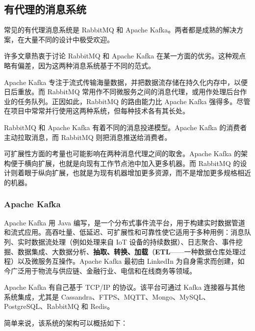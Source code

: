 \subsection{有代理的消息系统}

\label{idx:1534}
常见的有代理消息系统是 RabbitMQ 和 Apache Kafka。两者都是成熟的解决方案，在大量不同的设计中极受欢迎。

\label{idx:1535}
许多文章热衷于讨论 RabbitMQ 和 Apache Kafka 在某一方面的优劣。这种观点略有偏差，因为这两种消息系统基于不同的范式。

Apache Kafka 专注于流式传输海量数据，并把数据流存储在持久化内存中，以便日后重放。而 RabbitMQ 常用作不同微服务之间的消息代理，或用作处理后台作业的任务队列。正因如此，RabbitMQ 的路由能力比 Apache Kafka 强得多。尽管在项目中常常并行使用这两种系统，但每种技术各有其长处。

RabbitMQ 和 Apache Kafka 有着不同的消息投递模型。Apache Kafka 的消费者主动拉取消息，而 RabbitMQ 则把消息推送给消费者。

可扩展性方面的考量也可能影响在两种消息代理之间的取舍。Apache Kafka 的架构便于横向扩展，也就是向现有工作节点池中加入更多机器。而 RabbitMQ 的设计则着眼于纵向扩展，也就是为现有机器增加更多资源，而不是增加更多规格相近的机器。

\subsubsection{Apache Kafka}

\label{idx:1536}
\label{idx:1537}
\label{idx:1538}
Apache Kafka 用 Java 编写，是一个分布式事件流平台，用于构建实时数据管道和流式应用。高吞吐量、低延迟、可扩展性和可靠性使它适用于多种用例：消息队列、实时数据流处理（例如处理来自 IoT 设备的持续数据）、日志聚合、事件挖掘、数据集成、大数据分析、\textbf{抽取、转换、加载}（\textbf{ETL}——一种数据仓库处理过程）以及微服务互操作。Apache Kafka 最初由 LinkedIn 为自身需求而创建，如今广泛用于物流与供应链、金融行业、电信和在线商务等领域。

Apache Kafka 有自己基于 TCP/IP 的协议。该平台可通过 Kafka 连接器与其他系统集成，尤其是 Cassandra、FTPS、MQTT、Mongo、MySQL、PostgreSQL、RabbitMQ 和 Redis。

简单来说，该系统的架构可以概括如下：

